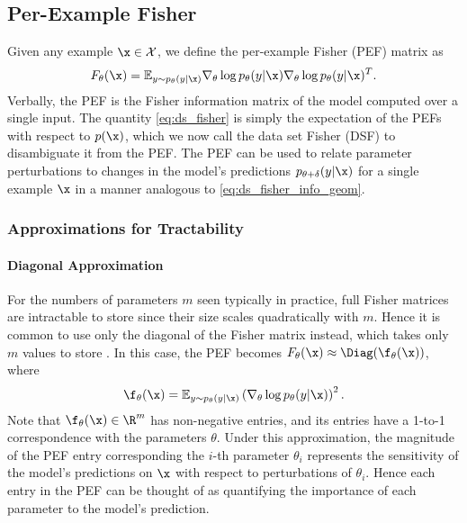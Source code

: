 \documentclass[dvipsnames]{article}
\begin{document}
\subsection{Per-Example Fisher}
Given any example $\x\in\mathcal X$, we define the per-example Fisher (PEF) matrix as \begin{equation}
    F_\theta(\x) = \mathbb E_{y\sim p_\theta(y|\x)} \nabla_\theta \log p_\theta(y|\x) \nabla_\theta \log p_\theta(y|\x)^T.
\end{equation}
Verbally, the PEF is the Fisher information matrix of the model computed over a single input.
The quantity \eqref{eq:ds_fisher} is simply the expectation of the PEFs with respect to $p(\x)$, which we now call the data set Fisher (DSF) to disambiguate it from the PEF.
The PEF can be used to relate parameter perturbations to changes in the model's predictions $p_{\theta+\delta}(y|\x)$ for a single example $\x$ in a manner analogous to \eqref{eq:ds_fisher_info_geom}.

\subsubsection{Approximations for Tractability}\label{sec:approx_tract}

\paragraph{Diagonal Approximation}
For the numbers of parameters $m$ seen typically in practice, full Fisher matrices are intractable to store since their size scales quadratically with $m$.%
Hence it is common to use only the diagonal of the Fisher matrix instead, which takes only $m$ values to store \cite{kirkpatrick2017overcoming}.
In this case, the PEF becomes $F_\theta(\x) \approx \Diag(\f_\theta(\x))$, where 
\begin{equation}\label{eq:dense_pef_vector}
    \f_\theta(\x) = \mathbb E_{y\sim p_\theta(y|\x)} \left(\nabla_\theta \log p_\theta(y|\x)\right)^2.
\end{equation}
Note that $\f_\theta(\x) \in \R^m$ has non-negative entries, and its entries have a 1-to-1 correspondence with the parameters $\theta$.
Under this approximation, the magnitude of the PEF entry corresponding the $i$-th parameter $\theta_i$ represents the sensitivity of the model's predictions on $\x$ with respect to perturbations of $\theta_i$.
Hence each entry in the PEF can be thought of as quantifying the importance of each parameter to the model's prediction.
\end{document}
